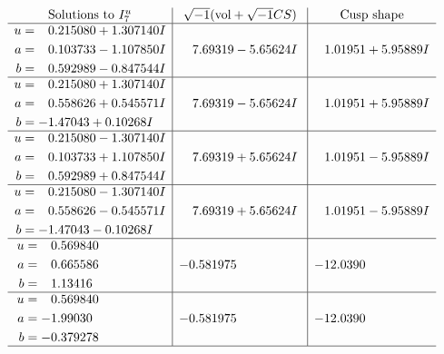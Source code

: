 \documentclass[1p]{elsarticle_modified}
\theoremstyle{definition}
\newcommand{\I}{\sqrt{-1}}
\begin{document}
$$\begin{array}{c|c|c}  
\text{Solutions to }I^u_{7}& \I (\text{vol} + \sqrt{-1}CS) & \text{Cusp shape}\\
 \hline 
\begin{aligned}
u &= \phantom{-}0.215080 + 1.307140 I \\
a &= \phantom{-}0.103733 - 1.107850 I \\
b &= \phantom{-}0.592989 - 0.847544 I\end{aligned}
 & \phantom{-}7.69319 - 5.65624 I & \phantom{-}1.01951 + 5.95889 I \\ \hline\begin{aligned}
u &= \phantom{-}0.215080 + 1.307140 I \\
a &= \phantom{-}0.558626 + 0.545571 I \\
b &= -1.47043 + 0.10268 I\end{aligned}
 & \phantom{-}7.69319 - 5.65624 I & \phantom{-}1.01951 + 5.95889 I \\ \hline\begin{aligned}
u &= \phantom{-}0.215080 - 1.307140 I \\
a &= \phantom{-}0.103733 + 1.107850 I \\
b &= \phantom{-}0.592989 + 0.847544 I\end{aligned}
 & \phantom{-}7.69319 + 5.65624 I & \phantom{-}1.01951 - 5.95889 I \\ \hline\begin{aligned}
u &= \phantom{-}0.215080 - 1.307140 I \\
a &= \phantom{-}0.558626 - 0.545571 I \\
b &= -1.47043 - 0.10268 I\end{aligned}
 & \phantom{-}7.69319 + 5.65624 I & \phantom{-}1.01951 - 5.95889 I \\ \hline\begin{aligned}
u &= \phantom{-}0.569840\phantom{ +0.000000I} \\
a &= \phantom{-}0.665586\phantom{ +0.000000I} \\
b &= \phantom{-}1.13416\phantom{ +0.000000I}\end{aligned}
 & -0.581975\phantom{ +0.000000I} & -12.0390\phantom{ +0.000000I} \\ \hline\begin{aligned}
u &= \phantom{-}0.569840\phantom{ +0.000000I} \\
a &= -1.99030\phantom{ +0.000000I} \\
b &= -0.379278\phantom{ +0.000000I}\end{aligned}
 & -0.581975\phantom{ +0.000000I} & -12.0390\phantom{ +0.000000I}\\
 \hline 
 \end{array}$$\newpage\newpage\renewcommand{\arraystretch}{1}
\end{document}

